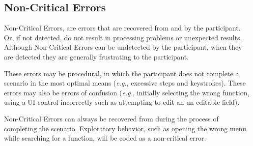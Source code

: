 \subsection{Non-Critical Errors}

Non-Critical Errors, are errors that are recovered from and by the participant. Or, if not detected, do not result in processing problems or unexpected results. Although Non-Critical Errors can be undetected by the participant, when they are detected they are generally frustrating to the participant.

These errors may be procedural, in which the participant does not complete a scenario in the most optimal means ({\it e.g.}, excessive steps and keystrokes). These errors may also be errors of confusion ({\it e.g.}, initially selecting the wrong function, using a UI control incorrectly such as attempting to edit an un-editable field).

Non-Critical Errors can always be recovered from during the process of completing the scenario. Exploratory behavior, such as opening the wrong menu while searching for a function, will be coded as a non-critical error.